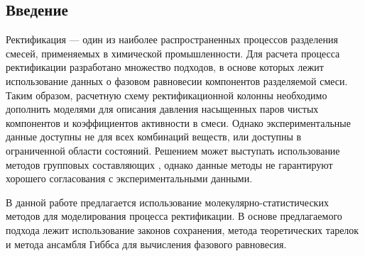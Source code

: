 \subsection*{Введение}

Ректификация --- один из наиболее распространенных процессов разделения смесей, применяемых в химической промышленности. Для расчета процесса ректификации разработано множество подходов, в основе которых лежит использование данных о фазовом равновесии компонентов разделяемой смеси. Таким образом, расчетную схему ректификационной колонны необходимо дополнить моделями для описания давления насыщенных паров чистых компонентов и коэффициентов активности в смеси. Однако экспериментальные данные доступны не для всех комбинаций веществ, или доступны в ограниченной области состояний. Решением может выступать использование методов групповых составляющих \cite{Skjold-Jorgensen1979,Tiegs1987,Wittig2003}, однако данные методы не гарантируют хорошего согласования с экспериментальными данными.

В данной работе предлагается использование молекулярно-статистических методов для моделирования процесса ректификации. В основе предлагаемого подхода лежит использование законов сохранения, метода теоретических тарелок и метода ансамбля Гиббса для вычисления фазового равновесия.
